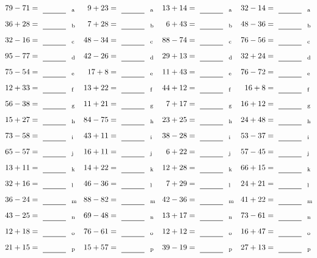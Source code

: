 \documentclass
[
  draft    = true,
  fontsize = 11pt,
  parskip  = half-
]
{scrartcl}
\begin{document}
\clearpage
\begin{align*}
    \pline{79-71}&=\rline{a}
  & \pline{9+23}&=\rline{a}
  & \pline{13+14}&=\rline{a}
  & \pline{32-14}&=\rline{a} \\[1ex]
    \pline{36+28}&=\rline{b}
  & \pline{7+28}&=\rline{b}
  & \pline{6+43}&=\rline{b}
  & \pline{48-36}&=\rline{b} \\[1ex]
    \pline{32-16}&=\rline{c}
  & \pline{48-34}&=\rline{c}
  & \pline{88-74}&=\rline{c}
  & \pline{76-56}&=\rline{c} \\[1ex]
    \pline{95-77}&=\rline{d}
  & \pline{42-26}&=\rline{d}
  & \pline{29+13}&=\rline{d}
  & \pline{32+24}&=\rline{d} \\[1ex]
    \pline{75-54}&=\rline{e}
  & \pline{17+8}&=\rline{e}
  & \pline{11+43}&=\rline{e}
  & \pline{76-72}&=\rline{e} \\[1ex]
    \pline{12+33}&=\rline{f}
  & \pline{13+22}&=\rline{f}
  & \pline{44+12}&=\rline{f}
  & \pline{16+8}&=\rline{f} \\[1ex]
    \pline{56-38}&=\rline{g}
  & \pline{11+21}&=\rline{g}
  & \pline{7+17}&=\rline{g}
  & \pline{16+12}&=\rline{g} \\[1ex]
    \pline{15+27}&=\rline{h}
  & \pline{84-75}&=\rline{h}
  & \pline{23+25}&=\rline{h}
  & \pline{24+48}&=\rline{h} \\[1ex]
    \pline{73-58}&=\rline{i}
  & \pline{43+11}&=\rline{i}
  & \pline{38-28}&=\rline{i}
  & \pline{53-37}&=\rline{i} \\[1ex]
    \pline{65-57}&=\rline{j}
  & \pline{16+11}&=\rline{j}
  & \pline{6+22}&=\rline{j}
  & \pline{57-45}&=\rline{j} \\[1ex]
    \pline{13+11}&=\rline{k}
  & \pline{14+22}&=\rline{k}
  & \pline{12+28}&=\rline{k}
  & \pline{66+15}&=\rline{k} \\[1ex]
    \pline{32+16}&=\rline{l}
  & \pline{46-36}&=\rline{l}
  & \pline{7+29}&=\rline{l}
  & \pline{24+21}&=\rline{l} \\[1ex]
    \pline{36-24}&=\rline{m}
  & \pline{88-82}&=\rline{m}
  & \pline{42-36}&=\rline{m}
  & \pline{41+22}&=\rline{m} \\[1ex]
    \pline{43-25}&=\rline{n}
  & \pline{69-48}&=\rline{n}
  & \pline{13+17}&=\rline{n}
  & \pline{73-61}&=\rline{n} \\[1ex]
    \pline{12+18}&=\rline{o}
  & \pline{76-61}&=\rline{o}
  & \pline{12+12}&=\rline{o}
  & \pline{16+47}&=\rline{o} \\[1ex]
    \pline{21+15}&=\rline{p}
  & \pline{15+57}&=\rline{p}
  & \pline{39-19}&=\rline{p}
  & \pline{27+13}&=\rline{p}
\end{align*}
\end{document}

